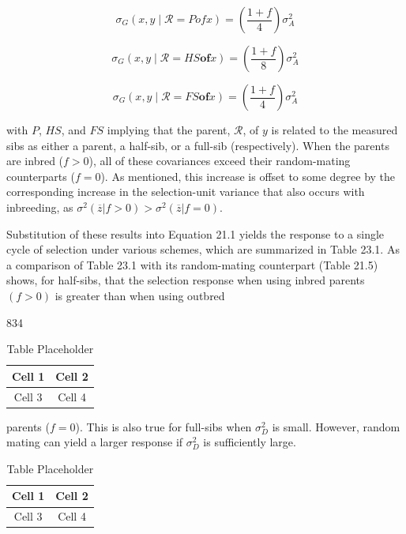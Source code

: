 \documentclass{article}
\begin{document}
\begin{equation}
\sigma_{G}(x,y\mid\mathcal{R}=P of x)=\left(\frac{1+f}{4}\right)\sigma_{A}^{2}
\tag{23.10a}
\label{eq:23_10a}
\end{equation}

\begin{equation}
\sigma_{G}(x,y\mid\mathcal{R}=H S\mathbf{o f}x)=\left(\frac{1+f}{8}\right)\sigma_{A}^{2}
\tag{23.10b}
\label{eq:23_10b}
\end{equation}

\begin{equation}
\sigma_{G}(x,y\mid\mathcal{R}=F S\mathbf{o f}x)=\left(\frac{1+f}{4}\right)\sigma_{A}^{2}
\tag{23.10c}
\label{eq:23_10c}
\end{equation}

with $P$, $HS$, and $FS$ implying that the parent, $\mathcal{R}$, of $y$ is related to the measured sibs as either a parent, a half-sib, or a full-sib (respectively). When the parents are inbred ($f > 0$), all of these covariances exceed their random-mating counterparts ($f = 0$). As mentioned, this increase is offset to some degree by the corresponding increase in the selection-unit variance that also occurs with inbreeding, as $\sigma^2(\overline{z} | f > 0) > \sigma^2(\overline{z} | f = 0)$.

Substitution of these results into Equation 21.1 yields the response to a single cycle of selection under various schemes, which are summarized in Table 23.1. As a comparison of Table 23.1 with its random-mating counterpart (Table 21.5) shows, for half-sibs, that the selection response when using inbred parents  $ (f > 0) $ is greater than when using outbred

834

\begin{table}[h]
\centering
\begin{tabular}{|c|c|}
\hline
Cell 1 & Cell 2 \\
\hline
Cell 3 & Cell 4 \\
\hline
\end{tabular}
\caption{Table Placeholder}
\end{table}

parents ($f=0$). This is also true for full-sibs when $\sigma_D^2$ is small. However, random mating can yield a larger response if $\sigma_D^2$ is sufficiently large.

\begin{table}[h]
\centering
\begin{tabular}{|c|c|}
\hline
Cell 1 & Cell 2 \\
\hline
Cell 3 & Cell 4 \\
\hline
\end{tabular}
\caption{Table Placeholder}
\end{table}
\end{document}

